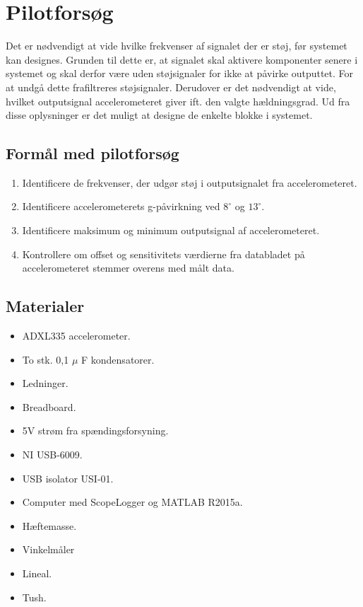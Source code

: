 \section{Pilotforsøg}
Det er nødvendigt at vide hvilke frekvenser af signalet der er støj, før systemet kan designes. Grunden til dette er, at signalet skal aktivere komponenter senere i systemet og skal derfor være uden støjsignaler for ikke at påvirke outputtet. For at undgå dette frafiltreres støjsignaler. Derudover er det nødvendigt at vide, hvilket outputsignal accelerometeret giver ift. den valgte hældningsgrad. Ud fra disse oplysninger er det muligt at designe de enkelte blokke i systemet.%

\subsection{Formål med pilotforsøg}
\begin{enumerate}
\item Identificere de frekvenser, der udgør støj i outputsignalet fra accelerometeret.
\item Identificere accelerometerets g-påvirkning ved $8^{\circ}$ og $13^{\circ}$.
\item Identificere maksimum og minimum outputsignal af accelerometeret.
\item Kontrollere om offset og sensitivitets værdierne fra databladet på accelerometeret stemmer overens med målt data.
\end{enumerate}

\subsection{Materialer}
\begin{itemize}
\item ADXL335 accelerometer.
\item To stk. 0,1 $\mu$ F kondensatorer.
\item Ledninger.
\item Breadboard.
\item 5V strøm fra spændingsforsyning.
\item NI USB-6009.
\item USB isolator USI-01.
\item Computer med ScopeLogger og MATLAB R2015a.
\item Hæftemasse.
\item Vinkelmåler
\item Lineal.
\item Tush.
\end{itemize}


